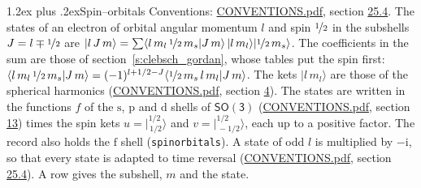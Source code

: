 \documentclass[10pt,a4paper]{article}
\makeatletter
\renewcommand\section{\@startsection{section}{1}{\z@}{-3ex plus -1ex minus -.2ex}%
  {1.2ex plus .2ex}{\normalfont\large\sffamily\bfseries\color{parttitle}}}
\numberwithin{equation}{section}
\newcommand{\grp}[1]{\mathsf{#1}}
\newcommand{\orbital}[1]{\mathrm{#1}}
\newcommand{\iunit}{\mathrm{i}}
\newcommand{\jm}[2]{\bigl\lvert{}^{#1}_{\,#2}\bigr\rangle}
\makeatother
\begin{document}
\section{Spin--orbitals}\label{s:spin_orbitals}
Conventions: \href{../../CONVENTIONS.pdf}{CONVENTIONS.pdf}, section \href{../../CONVENTIONS.pdf\#conv.25.4}{25.4}.
\leavevmode\label{n:index.orbital.l}The states of an electron of orbital angular momentum $l$ and spin $\nicefrac{1}{2}$ in the subshells $J = l \mp \nicefrac{1}{2}$ are $\lvert l\,J\,m\rangle = \sum \langle l\,m_l\,\nicefrac{1}{2}\,m_s \vert J\,m\rangle\,\lvert l\,m_l\rangle\lvert \nicefrac{1}{2}\,m_s\rangle$. The coefficients in the sum are those of section~\ref{s:clebsch_gordan}, whose tables put the spin first: $\langle l\,m_l\,\nicefrac{1}{2}\,m_s \vert J\,m\rangle = (-1)^{l+1/2-J}\langle \nicefrac{1}{2}\,m_s\,l\,m_l \vert J\,m\rangle$. The kets $\lvert l\,m_l\rangle$ are those of the spherical harmonics (\href{../../CONVENTIONS.pdf}{CONVENTIONS.pdf}, section \href{../../../rotation/CONVENTIONS.pdf\#conv.4}{4}). \label{n:local.function.f}The states are written in the functions $f$ of the $\orbital{s}$, $\orbital{p}$ and $\orbital{d}$ shells of \href{../../../rotation/data/pdf/SO3.pdf}{$\grp{SO(3)}$} (\href{../../CONVENTIONS.pdf}{CONVENTIONS.pdf}, section \href{../../../rotation/CONVENTIONS.pdf\#conv.13}{13}) times the spin kets $u = \jm{1/2}{1/2}$ and $v = \jm{1/2}{-1/2}$, each up to a positive factor. The record also holds the $\orbital{f}$ shell (\texttt{spinorbitals}). A state of odd $l$ is multiplied by $-\iunit$, so that every state is adapted to time reversal (\href{../../CONVENTIONS.pdf}{CONVENTIONS.pdf}, section \href{../../CONVENTIONS.pdf\#conv.25.4}{25.4}). \label{n:head.subshell}\label{n:head.state}A row gives the subshell, $m$ and the state.
\end{document}
